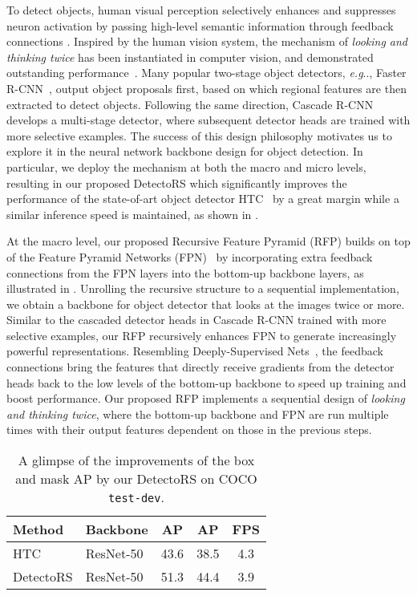 \documentclass[final]{cvpr}
\makeatletter
\def\@onedot{\ifx\@let@token.\else.\null\fi\xspace}
\DeclareRobustCommand\onedot{\futurelet\@let@token\@onedot}
\def\eg{\emph{e.g}\onedot} \def\Eg{\emph{E.g}\onedot}
\makeatother
\begin{document}
To detect objects, human visual perception selectively enhances and suppresses neuron activation by passing high-level semantic information through feedback connections \cite{beck2009top,desimone1998visual,desimone1995neural}.
Inspired by the human vision system, the mechanism of \textit{looking and thinking twice} has been instantiated in computer vision, and demonstrated outstanding performance~\cite{cao2015look,fasterrcnn,cascadercnn}.
Many popular two-stage object detectors, \eg, Faster R-CNN~\cite{fasterrcnn}, output object proposals first, based on which regional features are then extracted to detect objects.
Following the same direction, Cascade R-CNN~\cite{cascadercnn} develops a multi-stage detector, where subsequent detector heads are trained with more selective examples. 
The success of this design philosophy motivates us to explore it in the neural network backbone design for object detection.
In particular, we deploy the mechanism at both the macro and micro levels, resulting in our proposed DetectoRS which significantly improves the performance of the state-of-art object detector HTC~\cite{htc} by a great margin while a similar inference speed is maintained, as shown in .

At the macro level, our proposed Recursive Feature Pyramid (RFP) builds on top of the Feature Pyramid Networks (FPN)~\cite{fpn} by incorporating extra feedback connections from the FPN layers into the bottom-up backbone layers, as illustrated in . Unrolling the recursive structure to a sequential implementation, we obtain a backbone for object detector that looks at the images twice or more. Similar to the cascaded detector heads in Cascade R-CNN trained with more selective examples, our RFP recursively enhances FPN to generate increasingly powerful representations.
Resembling Deeply-Supervised Nets~\cite{lee2015deeply}, the feedback connections bring the features that directly receive gradients from the detector heads back to the low levels of the bottom-up backbone to speed up training and boost performance.
Our proposed RFP implements a sequential design of \textit{looking and thinking twice}, where the bottom-up backbone and FPN are run multiple times with their output features dependent on those in the previous steps.

\begin{table}[t]
\small
\setlength{\tabcolsep}{0.6em}
    \centering
    \begin{tabular}{ll|ccc}
    \toprule
    Method & Backbone & AP & AP & FPS\\
    \midrule
    HTC~\cite{htc} & ResNet-50 & 43.6 & 38.5 & 4.3\\
    DetectoRS & ResNet-50 & 51.3 & 44.4 & 3.9\\
    \bottomrule
    \end{tabular}
    \caption{A glimpse of the improvements of the box and mask AP by our DetectoRS on COCO \texttt{test-dev}.}
    \label{tab:intro}
\end{table}
\end{document}
